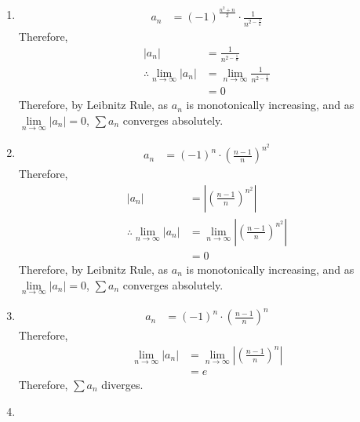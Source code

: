 \documentclass[fleqn, a4paper, 12pt, oneside]{amsart}
\theoremstyle{definition}
\theoremstyle{theorem}
\begin{document}
\begin{solution}
	\begin{enumerate}[label=(\alph*), leftmargin=*]
		\item 
			\begin{align*}
				a_n & = (-1)^{\frac{n^2 + n}{2}} \cdot \frac{1}{n^{2 - \frac{1}{n}}}
			\end{align*}
			Therefore,
			\begin{align*}
				|a_n|                                       & = \frac{1}{n^{2 - \frac{1}{n}}}                            \\
				\therefore \lim\limits_{n \to \infty} |a_n| & = \lim\limits_{n \to \infty} \frac{1}{n^{2 - \frac{1}{n}}} \\
                                                                            & = 0
			\end{align*}
			Therefore, by Leibnitz Rule, as $a_n$ is monotonically increasing, and as $\lim\limits_{n \to \infty} |a_n| = 0$, $\sum a_n$ converges absolutely.
		\item
			\begin{align*}
				a_n & = (-1)^n \cdot \left( \frac{n - 1}{n} \right)^{n^2}
			\end{align*}
			Therefore,
			\begin{align*}
				|a_n|                                       & = \left| \left( \frac{n - 1}{n} \right)^{n^2} \right|                            \\
				\therefore \lim\limits_{n \to \infty} |a_n| & = \lim\limits_{n \to \infty} \left| \left( \frac{n - 1}{n} \right)^{n^2} \right| \\
                                                                            & = 0
			\end{align*}
			Therefore, by Leibnitz Rule, as $a_n$ is monotonically increasing, and as $\lim\limits_{n \to \infty} |a_n| = 0$, $\sum a_n$ converges absolutely.
		\item
			\begin{align*}
				a_n & = (-1)^n \cdot \left( \frac{n - 1}{n} \right)^n
			\end{align*}
			Therefore,
			\begin{align*}
				\lim\limits_{n \to \infty} |a_n| & = \lim\limits_{n \to \infty} \left| \left( \frac{n - 1}{n} \right)^n \right| \\
                                                                 & = e
			\end{align*}
			Therefore, $\sum a_n$ diverges.
		\item

\end{enumerate}
\end{solution}
\end{document}
